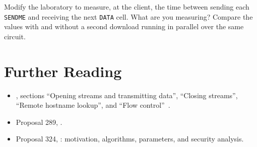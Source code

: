 \begin{esercizio}[3]\label{es:11-rtt}
Modify the laboratory to measure, at the client, the time between sending each \texttt{SENDME} and receiving the next \texttt{DATA} cell. What are you measuring? Compare the values with and without a second download running in parallel over the same circuit.
\end{esercizio}

\section*{Further Reading}
\begin{itemize}
  \item {}, sections \enquote{Opening streams and transmitting data}, \enquote{Closing streams}, \enquote{Remote hostname lookup}, and \enquote{Flow control}~\cite{torspec}.
  \item Proposal 289, .
  \item Proposal 324, : motivation, algorithms, parameters, and security analysis.
\end{itemize}
